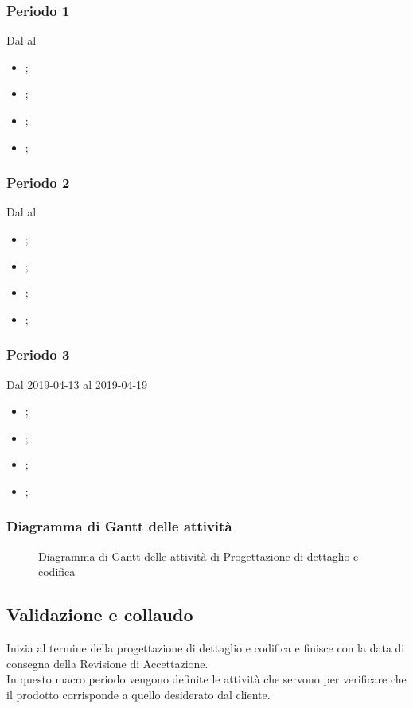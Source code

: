 \subsubsection{Periodo 1} 
Dal al
\begin{itemize}
	\item \textbf{};
	\item \textbf{};
	\item \textbf{};
	\item \textbf{};
\end{itemize}
\subsubsection{Periodo 2} 
Dal al
\begin{itemize}
	\item \textbf{};
	\item \textbf{};
	\item \textbf{};
	\item \textbf{};
\end{itemize}
\subsubsection{Periodo 3} 
Dal 2019-04-13 al 2019-04-19
\begin{itemize}
	\item \textbf{};
	\item \textbf{};
	\item \textbf{};
	\item \textbf{};
\end{itemize}
\subsubsection{Diagramma di Gantt delle attività}
\begin{figure}[h]
	\caption{Diagramma di Gantt delle attività di Progettazione di dettaglio e codifica}
\end{figure}


\subsection{Validazione e collaudo}
Inizia al termine della progettazione di dettaglio e codifica e finisce con la data di consegna della Revisione di Accettazione.
\\In questo macro periodo vengono definite le attività che servono per verificare che il prodotto corrisponde a quello desiderato dal cliente.
